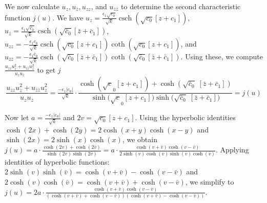 \documentclass[12pt]{article}
\theoremstyle{plain}
\theoremstyle{definition}
\theoremstyle{remark}
\begin{document}
  We now calculate \(u_z, u_{\bar z}, u_{zz}\), and \(u_{\bar z \bar z}\) to determine the second characteristic function \(j(u)\). We have \(u_z = \tfrac{\epsilon_1 \sqrt{c_0}}{\sqrt{k}} \operatorname{csch}(\sqrt{c_0}[z + c_1])\), \(u_{\bar z} = \tfrac{\epsilon_1 \sqrt{\bar{c}_0}}{\sqrt{k}} \operatorname{csch}(\sqrt{\bar{c}_0}[\bar{z} + \bar{c}_1])\), \(u_{zz} = -\tfrac{\epsilon_1 c_0}{\sqrt{k}} \operatorname{csch}(\sqrt{c_0}[z + c_1]) \operatorname{coth}(\sqrt{c_0}[z + c_1])\), and \(u_{\bar z \bar z} = -\tfrac{\epsilon_1 \bar{c}_0}{\sqrt{k}} \operatorname{csch}(\sqrt{\bar{c}_0}[\bar{z} + \bar{c}_1]) \operatorname{coth}(\sqrt{\bar{c}_0}[\bar{z} + \bar{c}_1])\). Using these, we compute $\frac{u_{zz}u_{\overline{z}}^2+u_{\overline{z}\overline{z}}u_z^2}{u_zu_{\overline{z}}}$ to get \(j\)
  \[
    \frac{u_{zz}u_{\overline{z}}^2+u_{\overline{z}\overline{z}}u_z^2}{u_zu_{\overline{z}}}=\tfrac{-\epsilon_1|c_0|}{\sqrt{k}}\cdot\frac{\cosh(\sqrt c_0[z+c_1])+\cosh(\sqrt{\bar c_0}\;[\bar z+\bar c_1])}{\sinh\big(\sqrt c_0[z+c_1]\big)\sinh\big(\sqrt{\bar c_0}\;[\bar z+\bar c_1]\big)}=j(u)
  \]
 
 Now let \(a = \tfrac{-\epsilon_1 |c_0|}{\sqrt{k}}\) and \(2v = \sqrt{c_0}[z + c_1]\). Using the hyperbolic identities \(\cosh(2x) + \cosh(2y) = 2\cosh(x + y)\cosh(x - y)\) and \(\sinh(2x) = 2\sinh(x)\cosh(x)\), we obtain \(j(u) = a \cdot \frac{\cosh(2v) + \cosh(2\bar{v})}{\sinh(2v)\sinh(2\bar{v})} = a \cdot \frac{\cosh(v + \bar{v})\cosh(v - \bar{v})}{2\sinh(v)\cosh(v)\sinh(\bar{v})\cosh(\bar{v})}\). Applying identities of hyperbolic functions: \(2\sinh(v)\sinh(\bar{v}) = \cosh(v + \bar{v}) - \cosh(v - \bar{v})\) and \(2\cosh(v)\cosh(\bar{v}) = \cosh(v + \bar{v}) + \cosh(v - \bar{v})\), we simplify to \(j(u) = 2a \cdot \frac{\cosh(v + \bar{v})\cosh(v - \bar{v})}{(\cosh(v + \bar{v}) + \cosh(v - \bar{v}))(\cosh(v + \bar{v}) - \cosh(v - \bar{v}))}.\)
 
\end{document}
